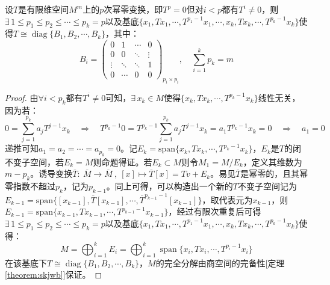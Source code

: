 \begin{lemma}\label{lemma:mlfj}
设$T$是有限维空间$M^m$上的$p$次幂零变换，即$T^p=0$但对$i<p$都有$T^i \neq 0$，则$\exists \, 1 \leq p_1 \leq p_2 \leq \cdots \leq p_k=p$以及基底$\{x_1,Tx_1,\cdots,T^{p_1-1}x_1,\cdots,x_k,Tx_k,\cdots,T^{p_k-1}x_k\}$使得$T \cong \operatorname{diag}\{B_1,B_2,\cdots,B_k\}$，其中：
\[B_i=\begin{pmatrix}
0 & 1 & \cdots & 0 \\
0 & 0 & \ddots & \vdots \\
\vdots & \ddots & \ddots & 1 \\
0 & \cdots & 0 & 0
\end{pmatrix}_{p_i \times p_i}, \quad \sum_{i=1}^kp_k=m\]
\end{lemma}
\begin{proof}
由$\forall i<p_k$都有$T^i \neq 0$可知，$\exists \, x_k \in M$使得$\{x_k,Tx_k,\cdots,T^{p_k-1}x_k\}$线性无关，因为若：
\[0=\sum_{j=1}^{p_k}a_jT^{j-1}x_k \quad \Rightarrow \quad T^{p_k-1}0=T^{p_k-1}\sum_{j=1}^{p_k}a_jT^{j-1}x_k=a_1T^{p_k-1}x_k=0 \quad \Rightarrow \quad a_1=0\]
递推可知$a_1=a_2=\cdots=a_{p_k}=0$。记$E_k=\text{span}\{x_k,Tx_k,\cdots,T^{p_k-1}x_k\}$，$E_k$是$T$的闭不变子空间，若$E_k=M$则命题得证。若$E_k \subset M$则令$M_1=M/E_k$，定义其维数为$m-p_k$。诱导变换$\overline{T}: \ \overline{M}\to\overline{M} \ , \ [x] \mapsto \overline{T}[x]=Tv+E_k$。易见$\overline{T}$是幂零的，且其幂零指数不超过$p_k$，记为$p_{k-1}$。同上可得，可以构造出一个新的$T$不变子空间记为$E_{k-1}=\text{span}\{[x_{k-1}],\overline{T}[x_{k-1}],\cdots,\overline{T}^{p_{k-1}-1}[x_{k-1}]\}$，取代表元为$x_{k-1}$，则$E_{k-1}=\text{span}\{x_{k-1},Tx_{k-1},\cdots,T^{p_{k-1}-1}x_{k-1}\}$，经过有限次重复后可得$\exists \, 1 \leq p_1 \leq p_2 \leq \cdots \leq p_k=p$以及基底$\{x_1,Tx_1,\cdots,T^{p_1-1}x_1,\cdots,x_k,Tx_k,\cdots,T^{p_k-1}x_k\}$使得：
\[M=\bigoplus_{i=1}^kE_i=\bigoplus_{i=1}^k \operatorname{span}\{x_i,Tx_i,\cdots,T^{p_i-1}x_i\}\]
在该基底下$T \cong \operatorname{diag}\{B_1,B_2,\cdots,B_k\}$，$M$的完全分解由商空间的完备性[定理\ref{theorem:skjwb}]保证。
\end{proof}

